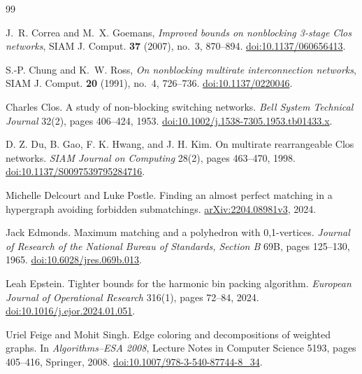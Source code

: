 \documentclass[11pt]{article}
\theoremstyle{definition}\newtheorem{algorithm}{Algorithm}[section]
\numberwithin{equation}{section}
\theoremstyle{remark}\newtheorem*{remark}{Remark}
\begin{document}
\begin{thebibliography}{99}

J.~R. Correa and M.~X. Goemans,
\emph{Improved bounds on nonblocking 3-stage Clos networks},
SIAM J. Comput. \textbf{37} (2007), no.~3, 870--894.
\href{https://doi.org/10.1137/060656413}{doi:10.1137/060656413}.

S.-P. Chung and K.~W. Ross,
\emph{On nonblocking multirate interconnection networks},
SIAM J. Comput. \textbf{20} (1991), no.~4, 726--736.
\href{https://doi.org/10.1137/0220046}{doi:10.1137/0220046}.

 Charles Clos.
A study of non-blocking switching networks.
\emph{Bell System Technical Journal} 32(2), pages 406--424, 1953.
\href{https://doi.org/10.1002/j.1538-7305.1953.tb01433.x}{doi:10.1002/j.1538-7305.1953.tb01433.x}.

 D. Z. Du, B. Gao, F. K. Hwang, and J. H. Kim.
On multirate rearrangeable Clos networks.
\emph{SIAM Journal on Computing} 28(2), pages 463--470, 1998.
\href{https://doi.org/10.1137/S0097539795284716}{doi:10.1137/S0097539795284716}.

 Michelle Delcourt and Luke Postle.
Finding an almost perfect matching in a hypergraph avoiding forbidden
submatchings.
\href{https://arxiv.org/html/2204.08981v3}{arXiv:2204.08981v3}, 2024.

 Jack Edmonds.
Maximum matching and a polyhedron with 0,1-vertices.
\emph{Journal of Research of the National Bureau of Standards,
Section B} 69B, pages 125--130, 1965.
\href{https://doi.org/10.6028/jres.069b.013}{doi:10.6028/jres.069b.013}.

 Leah Epstein.
Tighter bounds for the harmonic bin packing algorithm.
\emph{European Journal of Operational Research} 316(1), pages 72--84, 2024.
\href{https://doi.org/10.1016/j.ejor.2024.01.051}{doi:10.1016/j.ejor.2024.01.051}.

 Uriel Feige and Mohit Singh.
Edge coloring and decompositions of weighted graphs.
In \emph{Algorithms--ESA 2008}, Lecture Notes in Computer Science 5193,
pages 405--416, Springer, 2008.
\href{https://doi.org/10.1007/978-3-540-87744-8_34}{doi:10.1007/978-3-540-87744-8\_34}.


\end{thebibliography}
\end{document}
